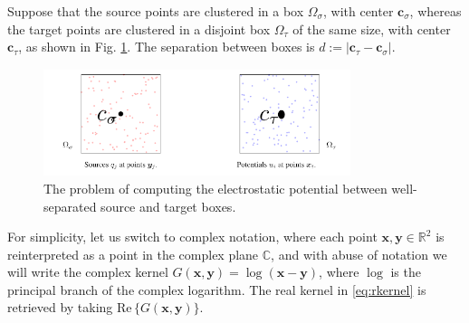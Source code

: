 \documentclass[final,onefignum,onetabnum]{siamart220329}
\newcommand{\bol}{\boldsymbol}
\newcommand{\real}{\mathrm{Re}\,}
\newcommand{\R}{\mathbb{R}}
\newcommand{\C}{\mathbb{C}}
\newcommand{\abs}[1]{\left|#1\right|}
\begin{document}
Suppose that the source points are clustered in a box $\Omega_\sigma$, with center $\bol c_\sigma$, whereas the target points are clustered in a disjoint box $\Omega_\tau$ of the same size, with center $\bol c_\tau$, as shown in Fig. \ref{fig:stboxes}. The separation between boxes is $d:=\abs{\bol c_\tau-\bol c_\sigma}$.

\begin{figure}[h]
	\centering
	\includegraphics[width=0.8\textwidth]{stboxes}
	\caption{The problem of computing the electrostatic potential between well-separated source and target boxes.}
	\label{fig:stboxes}
\end{figure}

For simplicity, let us switch to complex notation, where each point $\bol x, \bol y \in \R^2$ is reinterpreted as a point in the complex plane $\C$, and with abuse of notation we will write the complex kernel $G(\bol x, \bol y) = \log(\bol x-\bol y)$, where $\log$ is the principal branch of the complex logarithm. The real kernel in \cref{eq:rkernel} is retrieved by taking $\real\{G(\bol x, \bol y)\}$.
\end{document}
